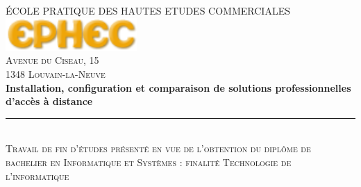 \begin{titlepage}
\newcommand{\HRule}{\rule{\linewidth}{0.5mm}} %

\center %
 

\textsc{\large ÉCOLE PRATIQUE DES HAUTES ETUDES COMMERCIALES}\\[0.5cm] %


\includegraphics[width=5cm]{ephec.png}\\[0.5cm] %
 

\textsc{Avenue du Ciseau, 15}\\ %
\textsc{1348 Louvain-la-Neuve}\\[1.5cm] %


{ \huge \bfseries Installation, configuration et comparaison de solutions professionnelles d'accès à distance}\\[0.4cm] %
\HRule \\[0.4cm]
\textsc{\small Travail de fin d'études présenté en vue de l'obtention du diplôme de bachelier en Informatique et Systèmes : finalité Technologie de l'informatique}\\[1.5cm] %
 


\end{titlepage}

